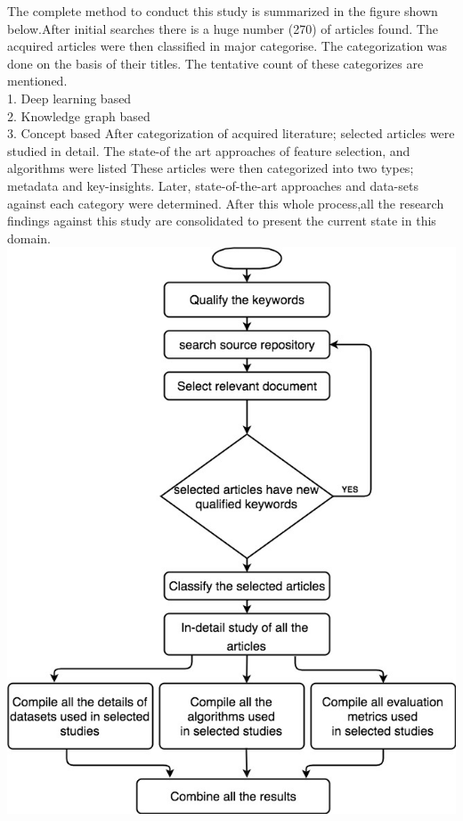 The complete method to conduct this study is summarized in the figure shown below.After initial searches there is a huge number (270) of articles found. The acquired articles were then classified in major categorise. The categorization was done on the basis of their titles. The tentative count of these categorizes are mentioned.
\\1. Deep learning based
\\2. Knowledge graph based
\\3. Concept based
 After categorization of acquired literature; selected articles were studied in detail. The state-of the art approaches of feature selection, and algorithms were listed These articles were then  categorized into two types; metadata and key-insights. Later, state-of-the-art approaches and data-sets against each category were determined. After this whole process,all the research findings against this study are consolidated to present the current state in this domain. 
 \newline
 \includegraphics[width=14cm]{images/surveymethidilogy.jpg}
\pagebreak{}
